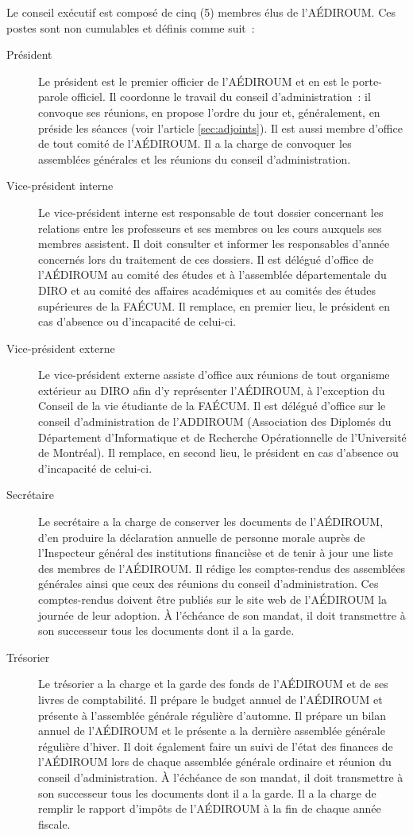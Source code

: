 \documentclass{aediroum}
\newcommand{\article}[1]{article \ref{#1}}
\begin{document}
Le conseil exécutif est composé de cinq (5) membres élus de l'AÉDIROUM. Ces postes sont non cumulables et définis comme suit~:
\begin{description}
\item[Président] Le président est le premier officier de l'AÉDIROUM et en est le porte-parole officiel. Il coordonne le travail du conseil d'administration~: il convoque ses réunions, en propose l'ordre du jour et, généralement, en préside les séances (voir l'\article{sec:adjoints}). Il est aussi membre d'office de tout comité de l'AÉDIROUM. Il a la charge de convoquer les assemblées générales et les réunions du conseil d'administration.
\item[Vice-président interne] Le vice-président interne est responsable de tout dossier concernant les relations entre les professeurs et ses membres ou les cours auxquels ses membres assistent. Il doit consulter et informer les responsables d'année concernés lors du traitement de ces dossiers. Il est délégué d'office de l'AÉDIROUM au comité des études et à l'assemblée départementale du DIRO et au comité des affaires académiques et au comités des études supérieures de la FAÉCUM. Il remplace, en premier lieu, le président en cas d'absence ou d'incapacité de celui-ci.
\item[Vice-président externe] Le vice-président externe assiste d'office aux réunions de tout organisme extérieur au DIRO afin d'y représenter l'AÉDIROUM, à l'exception du Conseil de la vie étudiante de la FAÉCUM. Il est délégué d'office sur le conseil d'administration de l'ADDIROUM (Association des Diplomés du Département d'Informatique et de Recherche Opérationnelle de l'Université de Montréal). Il remplace, en second lieu, le président en cas d'absence ou d'incapacité de celui-ci.
\item[Secrétaire] Le secrétaire a la charge de conserver les documents de l'AÉDIROUM, d'en produire la déclaration annuelle de personne morale auprès de l'Inspecteur général des institutions financièse et de tenir à jour une liste des membres de l'AÉDIROUM. Il rédige les comptes-rendus des assemblées générales ainsi que ceux des réunions du conseil d'administration. Ces comptes-rendus doivent être publiés sur le site web de l'AÉDIROUM la journée de leur adoption. À l'échéance de son mandat, il doit transmettre à son successeur tous les documents dont il a la garde.
\item[Trésorier] Le trésorier a la charge et la garde des fonds de l'AÉDIROUM et de ses livres de comptabilité. Il prépare le budget annuel de l'AÉDIROUM et présente à l'assemblée générale régulière d'automne. Il prépare un bilan annuel de l'AÉDIROUM et le présente a la dernière assemblée générale régulière d'hiver. Il doit également faire un suivi de l'état des finances de l'AÉDIROUM lors de chaque assemblée générale ordinaire et réunion du conseil d'administration. À l'échéance de son mandat, il doit transmettre à son successeur tous les documents dont il a la garde. Il a la charge de remplir le rapport d'impôts de l'AÉDIROUM à la fin de chaque année fiscale.
\end{description}
\end{document}
